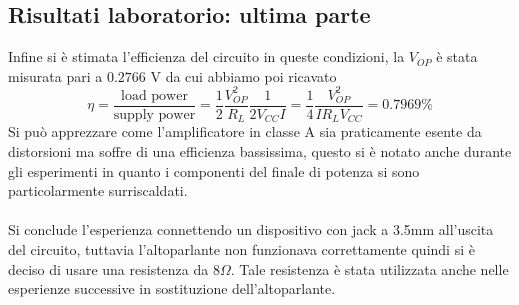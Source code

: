 \subsection{Risultati laboratorio: ultima parte}
Infine si è stimata l'efficienza del circuito in queste condizioni, la $V_{OP}$ è stata misurata pari a $0.
2766\text{ V}$ da cui abbiamo poi ricavato
\begin{equation}
    \eta=\frac{\text{load power}}{\text{supply power}}=\frac{1}{2}\frac{V_{OP}^2}{R_L}\frac{1}{2V_{CC}I}=\frac{1}{4}\frac{V_{OP}^2}{IR_LV_{CC}}=0.7969\%
\end{equation}
Si può apprezzare come l'amplificatore in classe A sia praticamente esente da distorsioni ma soffre di una efficienza bassissima, questo si è notato anche durante gli esperimenti in quanto i componenti del finale di potenza si sono particolarmente surriscaldati.\\\\
Si conclude l'esperienza connettendo un dispositivo con jack a 3.5mm all'uscita del circuito, tuttavia l'altoparlante non funzionava correttamente quindi si è deciso di usare una resistenza da 8$\Omega$. Tale resistenza è stata utilizzata anche nelle esperienze successive in sostituzione dell'altoparlante.
